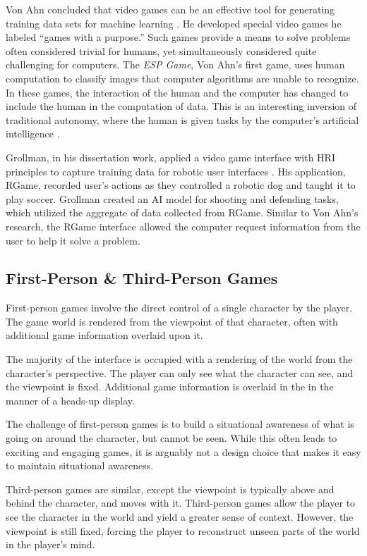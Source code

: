 Von Ahn concluded that video games can be an effective tool for generating training data sets for machine learning \cite{GWAP}. He developed special video games he labeled ``games with a purpose.''  Such games provide a means to solve problems often considered trivial for humans, yet simultaneously considered quite challenging for computers. The \emph{ESP Game}, Von Ahn's first game, uses human computation to classify images that computer algorithms are unable to recognize. In these games, the interaction of the human and the computer has changed to include the human in the computation of data. This is an interesting inversion of traditional autonomy, where the human is given tasks by the computer's artificial intelligence \cite{GWAP}.

Grollman, in his dissertation work, applied a video game interface with HRI principles to capture training data for robotic user interfaces \cite{Grollman}. His application, RGame, recorded user’s actions as they controlled a robotic dog and taught it to play soccer. Grollman created an AI model for shooting and defending tasks, which utilized the aggregate of data collected from RGame. Similar to Von Ahn's research, the RGame interface allowed the computer request information from the user to help it solve a problem.

\subsection{First-Person \& Third-Person Games} %
\label{sub:first_person_games}
First-person games involve the direct control of a single character by the player. The game world is rendered from the viewpoint of that character, often with additional game information overlaid upon it. 

The majority of the interface is occupied with a rendering of the world from the character’s perspective. The player can only see what the character can see, and the viewpoint is fixed. Additional game information is overlaid in the in the manner of a heads-up display.

The challenge of first-person games is to build a situational awareness of what is going on around the character, but cannot be seen. While this often leads to exciting and engaging games, it is arguably not a design choice that makes it easy to maintain situational awareness.

Third-person games are similar, except the viewpoint is typically above and behind the character, and moves with it. Third-person games allow the player to see the character in the world and yield a greater sense of context. However, the viewpoint is still fixed, forcing the player to reconstruct unseen parts of the world in the player's mind.

